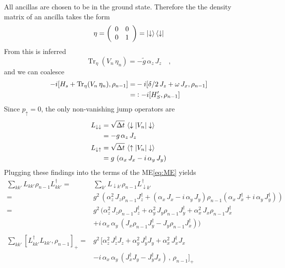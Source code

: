\documentclass{article}
\begin{document}
All ancillas are chosen to be in the ground state. Therefore the the density matrix of an ancilla takes the form
\begin{equation*}
    \eta=\left(\begin{array}{cc}
      0   & 0 \\
       0  & 1
    \end{array}\right)=\ket{\downarrow}\bra{\downarrow}
\end{equation*}
From this is inferred 
\begin{equation*}
    \operatorname{Tr}_\eta(V_n\,\eta_n)=-\tilde{g}\,\alpha_z\,J_z\quad,
\end{equation*}
and we can coalesce
\begin{align*}
    -i[H_s + \operatorname{Tr}_\eta(V_n\,\eta_n), \rho_{n-1}]=&-i[\delta/2\,J_z+\omega\,J_x,\rho_{n-1}]\\
    =&\vcentcolon-i[H_S',\rho_{n-1}]
\end{align*}
Since $p_\uparrow=0$, the only non-vanishing jump operators are
\begin{align*}
    L_{\downarrow\downarrow}&=\sqrt{\Delta{t}}\,\braket{\downarrow|V_n|\downarrow}\\
    &=-g\,\alpha_z\,J_z\\
    L_{\downarrow\uparrow}&=\sqrt{\Delta{t}}\,\braket{\uparrow|V_n|\downarrow}\\
    &={g}\,\left(\alpha_x\,J_x-i\,\alpha_y\,J_y\right)
\end{align*}
Plugging these findings into the terms of the ME\ref{eq:ME} yields
\begin{align*}
    \sum_{kk'} L_{kk'} \rho_{n-1} L_{kk'}^\dagger=&\sum_{k'} L_{\downarrow{k}'} \rho_{n-1} L_{\downarrow{k}'}^\dagger\\
    =&g^2\,\left(\alpha_z^2\,J_z\rho_{n-1}J_z^\dagger+(\alpha_x\,J_x-i\,\alpha_y\,J_y)\rho_{n-1}(\alpha_x\,J_x^\dagger+i\,\alpha_y\,J_y^\dagger)\right)\\
    =&g^2\,(\alpha_z^2\,J_z\rho_{n-1}J_z^\dagger+\alpha_y^2\,J_y\rho_{n-1}J_y^\dagger+\alpha_x^2\,J_x\rho_{n-1}J_x^\dagger\\
    &+i\,\alpha_x\,\alpha_y\,(J_x\rho_{n-1}J_y^\dagger-J_y\rho_{n-1}J_x^\dagger))\\\\
    \sum_{kk'}\left[L_{kk'}^\dagger L_{kk'}, \rho_{n-1} \right]_+ =   &g^2\,\Big[\alpha_z^2\,J_z^\dagger J_z+\alpha_y^2\,J_y^\dagger J_y+\alpha_x^2\,J_x^\dagger J_x\\
    &-i\,\alpha_x\,\alpha_y\,(J_x^\dagger J_y-J_y^\dagger J_x)\,,\,\rho_{n-1}\Big]_+
\end{align*}
\end{document}
